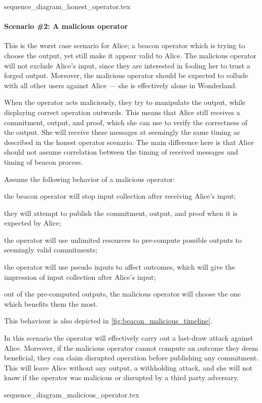 {sequence_diagram_honest_operator.tex}

\paragraph{Scenario \#2: A malicious operator}
This is the worst case scenario for Alice; a beacon operator which is trying to choose the output, yet still make it appear valid to Alice.
The malicious operator will not exclude Alice's input, since they are interested in fooling her to trust a forged output.
Moreover, the malicious operator should be expected to collude with all other users against Alice --- she is effectively alone in Wonderland.

When the operator acts maliciously, they try to manipulate the output, while displaying correct operation outwards.
This means that Alice still receives a commitment, output, and proof, which she can use to verify the correctness of the output.
She will receive these messages at seemingly the same timing as described in the honest operator scenario.
The main difference here is that Alice should not assume correlation between the timing of received messages and timing of beacon process.

Assume the following behavior of a malicious operator:
\begin{eletterate*}
\item the beacon operator will stop input collection after receiving Alice's input;
\item they will attempt to publish the commitment, output, and proof when it is expected by Alice;
\item the operator will use unlimited resources to pre-compute possible outputs to seemingly valid commitments;
\item the operator will use pseudo inputs to affect outcomes, which will give the impression of input collection after Alice's input;
\item out of the pre-computed outputs, the malicious operator will choose the one which benefits them the most.
\end{eletterate*}
This behaviour is also depicted in \cref{fig:beacon_malicious_timeline}.

In this scenario the operator will effectively carry out a last-draw attack against Alice.
Moreover, if the malicious operator cannot compute an outcome they deem beneficial, they can claim disrupted operation before publishing any commitment.
This will leave Alice without any output, a withholding attack, and she will not know if the operator was malicious or disrupted by a third party adversary.

{sequence_diagram_malicious_operator.tex}
